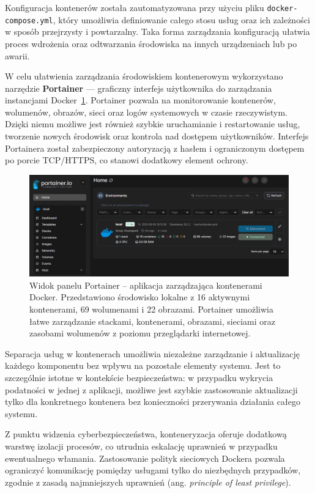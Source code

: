 \documentclass[
    left=2.5cm,         %
    right=2.5cm,        %
    top=2.5cm,          %
    bottom=3cm,         %
    bindingoffset=6mm,  %
    nohyphenation=true %
]{eiti/eiti-thesis} %
\begin{document}
Konfiguracja kontenerów została zautomatyzowana przy użyciu pliku \texttt{docker-compose.yml}, który umożliwia definiowanie całego stosu usług oraz ich zależności w sposób przejrzysty i powtarzalny. Taka forma zarządzania konfiguracją ułatwia proces wdrożenia oraz odtwarzania środowiska na innych urządzeniach lub po awarii.

W celu ułatwienia zarządzania środowiskiem kontenerowym wykorzystano narzędzie \textbf{Portainer} — graficzny interfejs użytkownika do zarządzania instancjami Docker~\ref{fig:portainer-dashboard}. Portainer pozwala na monitorowanie kontenerów, wolumenów, obrazów, sieci oraz logów systemowych w czasie rzeczywistym. Dzięki niemu możliwe jest również szybkie uruchamianie i restartowanie usług, tworzenie nowych środowisk oraz kontrola nad dostępem użytkowników. Interfejs Portainera został zabezpieczony autoryzacją z hasłem i ograniczonym dostępem po porcie TCP/HTTPS, co stanowi dodatkowy element ochrony.
\begin{figure}[H]
    \centering
    \includegraphics[width=\textwidth]{img/portainer.png}
    \caption{Widok panelu Portainer – aplikacja zarządzająca kontenerami Docker. Przedstawiono środowisko lokalne z 16 aktywnymi kontenerami, 69 wolumenami i 22 obrazami. Portainer umożliwia łatwe zarządzanie stackami, kontenerami, obrazami, sieciami oraz zasobami wolumenów z poziomu przeglądarki internetowej.}
    \label{fig:portainer-dashboard}
\end{figure}


Separacja usług w kontenerach umożliwia niezależne zarządzanie i aktualizację każdego komponentu bez wpływu na pozostałe elementy systemu. Jest to szczególnie istotne w kontekście bezpieczeństwa: w przypadku wykrycia podatności w jednej z aplikacji, możliwe jest szybkie zastosowanie aktualizacji tylko dla konkretnego kontenera bez konieczności przerywania działania całego systemu.

Z punktu widzenia cyberbezpieczeństwa, konteneryzacja oferuje dodatkową warstwę izolacji procesów, co utrudnia eskalację uprawnień w przypadku ewentualnego włamania. Zastosowanie polityk sieciowych Dockera pozwala ograniczyć komunikację pomiędzy usługami tylko do niezbędnych przypadków, zgodnie z zasadą najmniejszych uprawnień (ang. \textit{principle of least privilege}).
\end{document}
